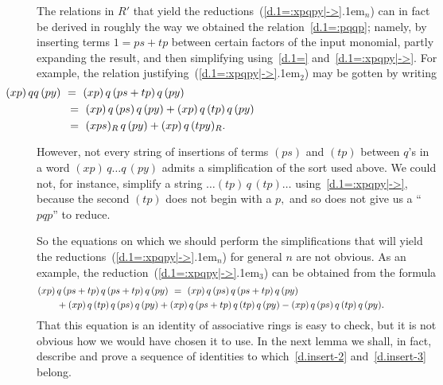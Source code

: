 \documentclass{amsart}
\begin{document}
The relations in $R'$ that yield the reductions~({{\setlength{\mathsurround}{0em}\ref{d.1=:xpqpy|->}\kern.1em$_{{n}}$}})
can in fact be derived in roughly the way we obtained the
relation~\eqref{d.1=:pqqp}; namely, by inserting terms $1=ps+tp$
between certain factors of the input
monomial, partly expanding the result, and then
simplifying using~\eqref{d.1=} and~\eqref{d.1=:xpqpy|->}.
For example, the relation justifying~({{\setlength{\mathsurround}{0em}\ref{d.1=:xpqpy|->}\kern.1em$_{{2}}$}}) may
be gotten by writing
\begin{equation}\begin{minipage}[c]{25pc}\label{d.insert-2}
\hspace*{-5.8em}$(xp)\,qq\,(py)\ =
\ (xp)\,q\,(ps+tp)\,q\,(py)\ \\[.3em]
=\ (xp)\,q\,(ps)\,q\,(py)+ (xp)\,q\,(tp)\,q\,(py)\ \\[.3em]
=\ (xps)_R\,q\,(py)+(xp)\,q\,(tpy)_R.$
\end{minipage}\end{equation}

However, not every string of insertions of terms $(ps)$
and $(tp)$ between $\!q\!$'s in a word $(xp)\,q\dots q\,(py)$
admits a simplification of the sort used above.
We could not, for instance, simplify
a string $\dots (tp)\,q\,(tp)\dots$
using~\eqref{d.1=:xpqpy|->}, because the second $(tp)$ does not
begin with a $p,$ and so does not give us a ``$pqp$'' to reduce.

So the equations on which we should perform the simplifications that
will yield the reductions~({{\setlength{\mathsurround}{0em}\ref{d.1=:xpqpy|->}\kern.1em$_{{n}}$}}) for general $n$ are not obvious.
As an example, the reduction~({{\setlength{\mathsurround}{0em}\ref{d.1=:xpqpy|->}\kern.1em$_{{3}}$}})
can be obtained from the formula
\begin{equation}\begin{minipage}[c]{35pc}\label{d.insert-3}
$(xp)\,q\,(ps+tp)\,q\,(ps+tp)\,q\,(py)\ =
\ (xp)\,q\,(ps)\,q\,(ps+tp)\,q\,(py)\\[.3em]
\hspace*{2em}+ (xp)\,q\,(tp)\,q\,(ps)\,q\,(py)
+ (xp)\,q\,(ps+tp)\,q\,(tp)\,q\,(py)
- (xp)\,q\,(ps)\,q\,(tp)\,q\,(py).$
\end{minipage}\end{equation}
That this equation is an identity of associative
rings is easy to check, but it is not obvious
how we would have chosen it to use.
In the next lemma we shall, in fact, describe and prove
a sequence of identities
to which~\eqref{d.insert-2} and~\eqref{d.insert-3} belong.
\end{document}
